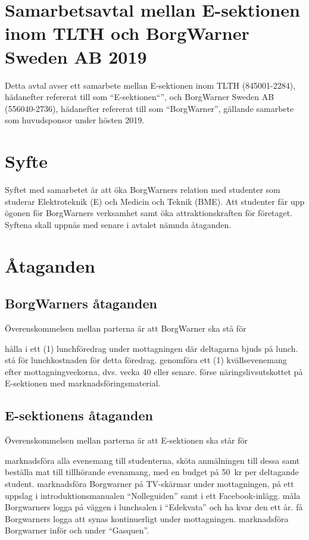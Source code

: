 \documentclass[10pt]{article}
\def\year{2019}
\def\doctitle{Samarbetsavtal mellan E-sektionen inom TLTH och BorgWarner Sweden AB {\year}}
\begin{document}
        \section*{\doctitle}
        Detta avtal avser ett samarbete mellan E-sektionen inom TLTH (845001-2284), hädanefter refererat till som “E-sektionen“”, och BorgWarner Sweden AB (556040-2736), hädanefter refererat till som  “BorgWarner”, gällande samarbete som huvudsponsor under hösten 2019.\\
        \section{Syfte}
       
       
        Syftet med samarbetet är att öka BorgWarners relation med studenter som studerar Elektroteknik (E) och Medicin och Teknik (BME). Att studenter får upp ögonen för BorgWarners verksamhet samt öka attraktionskraften för företaget. Syftena skall uppnås med senare i avtalet nämnda åtaganden.
       
       
       
        \section{Åtaganden}
        \subsection{BorgWarners åtaganden}
        Överenskommelsen mellan parterna är att BorgWarner ska stå för
        \begin{attsatser}
            \att hålla i ett (1) lunchföredrag under mottagningen där deltagarna bjuds på lunch.
            \att stå för lunchkostnaden för detta föredrag. 
            \att genomföra ett (1) kvällsevenemang efter mottagningveckorna, dvs. vecka 40 eller senare.
            \att förse näringslivsutskottet på E-sektionen med marknadsföringsmaterial.
        \end{attsatser}

        \subsection{E-sektionens åtaganden}
        Överenskommelsen mellan parterna är att E-sektionen ska står för
        \begin{attsatser}
            \att marknadsföra alla evenemang till studenterna, sköta anmälningen till dessa samt beställa mat till tillhörande evenamang, med en budget på \SI{50}{kr} per deltagande student.
            \att marknadsföra Borgwarner på TV-skärmar under mottagningen, på ett uppslag i introduktionsmanualen “Nolleguiden” samt i ett Facebook-inlägg.
            \att måla Borgwarners logga på väggen i lunchsalen i “Edekvata” och ha kvar den ett år.
            \att få Borgwarners logga att synas kontinuerligt under mottagningen.
            \att marknadsföra Borgwarner inför och under “Gasquen”.
            
        \end{attsatser}
        
\end{document}

